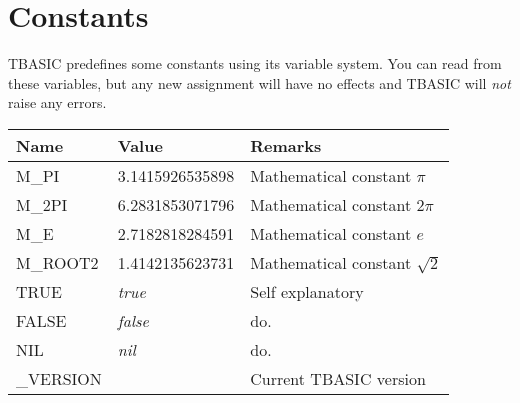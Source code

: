 \section{Constants}

TBASIC predefines some constants using its variable system. You can read from these variables, but any new assignment will have no effects and TBASIC will \emph{not} raise any errors.

\begin{tabularx}{\textwidth}{l l X}
	\textbf{Name} & \textbf{Value} & \textbf{Remarks}
	\\
	\endhead
	M\_PI    & 3.1415926535898 & Mathematical constant $\pi$ \\
	M\_2PI   & 6.2831853071796 & Mathematical constant $2\pi$ \\
	M\_E     & 2.7182818284591 & Mathematical constant $e$ \\
	M\_ROOT2 & 1.4142135623731 & Mathematical constant $\sqrt{2}$ \\
	TRUE    & \emph{true} & Self explanatory \\
	FALSE   & \emph{false} & do. \\
	NIL     & \emph{nil} & do. \\
	\_VERSION & \tbasver & Current TBASIC version \\
\end{tabularx}
